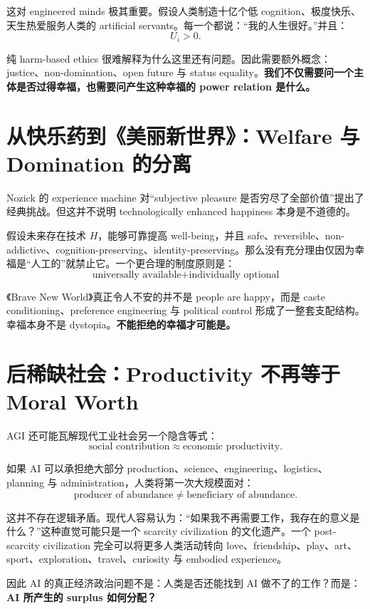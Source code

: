 \documentclass[11pt,letterpaper]{article}
\begin{document}
这对 engineered minds 极其重要。假设人类制造十亿个低 cognition、极度快乐、天生热爱服务人类的 artificial servants。每一个都说：“我的人生很好。”并且：
\[
U_i>0.
\]

纯 harm-based ethics 很难解释为什么这里还有问题。因此需要额外概念：justice、non-domination、open future 与 status equality。\textbf{我们不仅需要问一个主体是否过得幸福，也需要问产生这种幸福的 power relation 是什么。}

\section{从快乐药到《美丽新世界》：Welfare 与 Domination 的分离}

Nozick 的 experience machine 对“subjective pleasure 是否穷尽了全部价值”提出了经典挑战\cite{nozick1974}。但这并不说明 technologically enhanced happiness 本身是不道德的。

假设未来存在技术 $H$，能够可靠提高 well-being，并且 safe、reversible、non-addictive、cognition-preserving、identity-preserving。那么没有充分理由仅因为幸福是“人工的”就禁止它。一个更合理的制度原则是：
\[
\boxed{
\text{universally available}
+
\text{individually optional}
}
\]

《Brave New World》真正令人不安的并不是 people are happy，而是 caste conditioning、preference engineering 与 political control 形成了一整套支配结构。幸福本身不是 dystopia。\textbf{不能拒绝的幸福才可能是。}

\section{后稀缺社会：Productivity 不再等于 Moral Worth}

AGI 还可能瓦解现代工业社会另一个隐含等式：
\[
\text{social contribution}\approx\text{economic productivity}.
\]

如果 AI 可以承担绝大部分 production、science、engineering、logistics、planning 与 administration，人类将第一次大规模面对：
\[
\text{producer of abundance}\neq\text{beneficiary of abundance}.
\]

这并不存在逻辑矛盾。现代人容易认为：“如果我不再需要工作，我存在的意义是什么？”这种直觉可能只是一个 scarcity civilization 的文化遗产。一个 post-scarcity civilization 完全可以将更多人类活动转向 love、friendship、play、art、sport、exploration、travel、curiosity 与 embodied experience。

因此 AI 的真正经济政治问题不是：人类是否还能找到 AI 做不了的工作？而是：\textbf{AI 所产生的 surplus 如何分配？}
\end{document}
